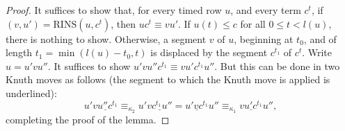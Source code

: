 \documentclass[10pt]{amsproc}
\theoremstyle{definition}
\theoremstyle{remark}
\newcommand{\rowins}{\mathrm{RINS}}
\begin{document}
\begin{proof}
  It suffices to show that, for every timed row $u$, and every term $c^t$, if $(v,u')=\rowins(u,c^t)$, then $uc^t\equiv vu'$.
  If $u(t)\leq c$ for all $0\leq t<l(u)$, there is nothing to show.
  Otherwise, a segment $v$ of $u$, beginning at $t_0$, and of length $t_1=\min(l(u)-t_0,t)$ is displaced by the segment $c^{t_1}$ of $c^t$.
  Write $u=u'vu''$.
  It suffices to show $u'vu''c^{t_1}\equiv vu'c^{t_1}u''$.
  But this can be done in two Knuth moves as follows (the segment to which the Knuth move is applied is underlined):
  \begin{displaymath}
    u'\underline{v u'' c^{t_1}} \equiv_{\kappa_2} u'\underline{vc^{t_1}u''} = \underline{u'vc^{t_1}}u'' \equiv_{\kappa_1} \underline{vu'c^{t_1}}u'',
  \end{displaymath}
  completing the proof of the lemma.
\end{proof}
\end{document}
